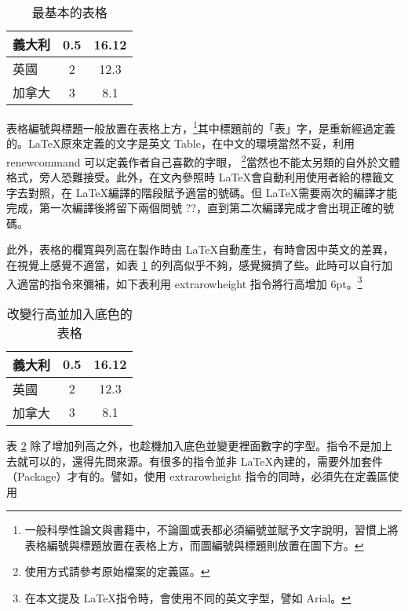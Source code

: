 \begin{table}[h] %
\centering
\caption{最基本的表格}\label{tb:basic_1}  %
\begin{tabular}{lcc}
    \hline
  義大利	& 0.5	& 16.12		\\\hline  %
  英國	& 2     	& 12.3		\\\hline
  加拿大 	& 3     	& 8.1		\\\hline
\end{tabular}
\end{table}

表格編號與標題一般放置在表格上方，\footnote{一般科學性論文與書籍中，不論圖或表都必須編號並賦予文字說明，習慣上將表格編號與標題放置在表格上方，而圖編號與標題則放置在圖下方。}其中標題前的「表」字，是重新經過定義的。\LaTeX 原來定義的文字是英文 Table，在中文的環境當然不妥，利用 {\A renewcommand} 可以定義作者自己喜歡的字眼， \footnote{使用方式請參考原始檔案的定義區。}當然也不能太另類的自外於文體格式，旁人恐難接受。此外，在文內參照時 \LaTeX 會自動利用使用者給的標籤文字去對照，在 \LaTeX 編譯的階段賦予適當的號碼。但 \LaTeX 需要兩次的編譯才能完成，第一次編譯後將留下兩個問號   ??，直到第二次編譯完成才會出現正確的號碼。

此外，表格的欄寬與列高在製作時由 \LaTeX 自動產生，有時會因中英文的差異，在視覺上感覺不適當，如表 \ref{tb:basic_1} 的列高似乎不夠，感覺擁擠了些。此時可以自行加入適當的指令來彌補，如下表利用  {\A extrarowheight} 指令將行高增加  6pt。\footnote{在本文提及 \LaTeX 指令時，會使用不同的英文字型，譬如 {\A Arial}。}


\begin{table}[h]
\centering
\caption{改變行高並加入底色的表格}\label{tb:basic_row_color}  %
\extrarowheight=6pt   %
\colorbox{slight}{\begin{tabular}{lcc}
\hline
  義大利	& 0.5	& 16.12		\\\hline  %
  英國	& 2     	& 12.3		\\\hline
  加拿大 	& 3     	& 8.1		\\\hline
\end{tabular}}
\end{table}

表 \ref{tb:basic_row_color} 除了增加列高之外，也趁機加入底色並變更裡面數字的字型。指令不是加上去就可以的，還得先問來源。有很多的指令並非 \LaTeX 內建的，需要外加套件（Package）才有的。譬如，使用 {\A extrarowheight} 指令的同時，必須先在定義區使用

